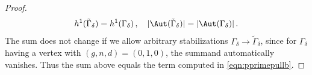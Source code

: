 \begin{proof}
\[h^1( \tilde \Gamma_\delta) = h^1(\Gamma_\delta)\, , \ \ \ |\Aut(\tilde \Gamma_\delta)| = |\Aut(\Gamma_\delta)|\, . \]
The sum does not change if we allow arbitrary stabilizations $\Gamma_\delta \to \tilde \Gamma_\delta$, since for $\Gamma_\delta$ having a vertex with $(g,n,d)=(0,1,0)$, the summand automatically vanishes. Thus the sum above equals the term computed in \eqref{eqn:pprimepullb}.
\end{proof}
